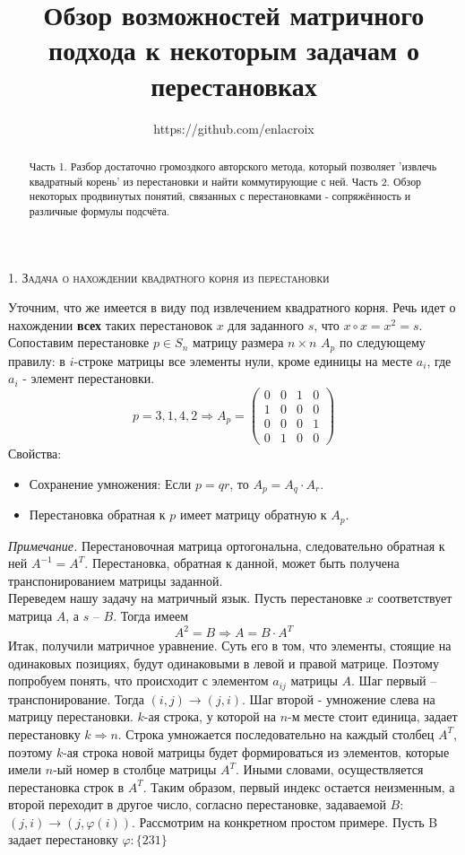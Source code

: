 \documentclass[a4paper,12pt]{article}
\begin{document}
 
\graphicspath{ {./imgs/} }
\title{Обзор возможностей матричного подхода к некоторым задачам о перестановках}
\author{https://github.com/enlacroix}
\maketitle
\begin{abstract}
Часть 1. Разбор достаточно громоздкого авторского метода, который позволяет 'извлечь квадратный корень' из перестановки и найти коммутирующие с ней. Часть 2. Обзор некоторых продвинутых понятий, связанных с перестановками - сопряжённость и различные формулы подсчёта. 
\end{abstract}
\begin{center}
    \textsc{1. Задача о нахождении квадратного корня из перестановки}
\end{center}
Уточним, что же имеется в виду под извлечением квадратного корня. Речь идет о нахождении \textbf{всех} таких перестановок $x$ для заданного $s$, что $x \circ x = x^2 = s.$ 
Сопоставим перестановке $p \in S_n$ матрицу размера $n \times n$ $A_p$ по следующему правилу: в $i$-строке матрицы все элементы нули, кроме единицы на месте $a_i$, где $a_i$ - элемент перестановки.
\[p = 3, 1, 4, 2 \Rightarrow A_p = \begin{pmatrix}
0 & 0 & 1 & 0 \\
1 & 0 & 0 & 0 \\
0 & 0 & 0 & 1 \\
0 & 1 & 0 & 0 
\end{pmatrix} \]
Свойства: 
\begin{itemize}
    \item Сохранение умножения: Если $p = qr$, то $A_p = A_q \cdot A_r$.
    \item Перестановка обратная к $p$ имеет матрицу обратную к $A_p$.
\end{itemize}
\textit{Примечание.} Перестановочная матрица ортогональна, следовательно обратная к ней $A^{-1} = A^T.$ Перестановка, обратная к данной, может быть получена транспонированием матрицы заданной. \\
Переведем нашу задачу на матричный язык. Пусть перестановке $x$ соответствует матрица $A$, а $s$ -- $B$. Тогда имеем
\[ A^2 = B \Rightarrow A = B \cdot A^T\]
Итак, получили матричное уравнение. Суть его в том, что элементы, стоящие на одинаковых позициях, будут одинаковыми в левой и правой матрице. Поэтому попробуем понять, что происходит с элементом $a_{ij}$ матрицы $A$. Шаг первый -- транспонирование. Тогда $(i, j) \longrightarrow (j, i).$ Шаг второй - умножение слева на матрицу перестановки. $k$-ая строка, у которой на $n$-м месте стоит единица, задает перестановку $k \Rightarrow n$. Строка умножается последовательно на каждый столбец $A^T$, поэтому $k$-ая строка новой матрицы будет формироваться из элементов, которые имели $n$-ый номер в столбце матрицы $A^T$. Иными словами, осуществляется перестановка строк в $A^T$. Таким образом, первый индекс остается неизменным, а второй переходит в другое число, согласно перестановке, задаваемой $B$: $(j, i) \longrightarrow (j, \varphi(i))$. Рассмотрим на конкретном простом примере. Пусть B задает перестановку $\varphi: \{231\}$ \\
\end{document}
